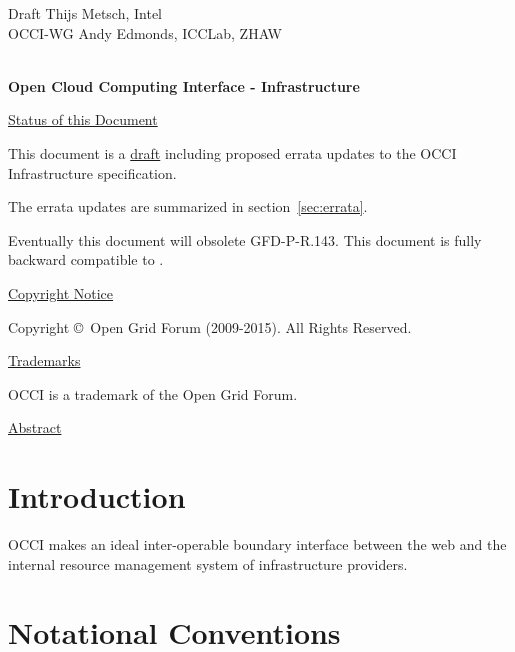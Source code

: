 \documentclass[10pt,a4paper]{article}
\begin{document}
\thispagestyle{empty}

Draft \hfill  Thijs Metsch, Intel\\
OCCI-WG \hfill  Andy Edmonds, ICCLab, ZHAW\\
\\

\vspace*{0.5in}

\begin{Large}
\textbf{Open Cloud Computing Interface - Infrastructure}
\end{Large}

\vspace*{0.5in}

\underline{Status of this Document}

% 

This document is a \underline{draft} including proposed errata updates
to the OCCI Infrastructure \cite{occi:infrastructure} specification.

The errata updates are summarized in section~\ref{sec:errata}.

Eventually this document will obsolete GFD-P-R.143. This document is
fully backward compatible to \cite{occi:infrastructure}.

\underline{Copyright Notice}

Copyright \copyright ~Open Grid Forum (2009-2015). All Rights
Reserved.

\underline{Trademarks}

OCCI is a trademark of the Open Grid Forum.

\underline{Abstract}



\newpage
\tableofcontents
\newpage

\section{Introduction}


OCCI makes an ideal inter-operable boundary interface between the web
and the internal resource management system of infrastructure
providers.

\section{Notational Conventions}

\end{document}
